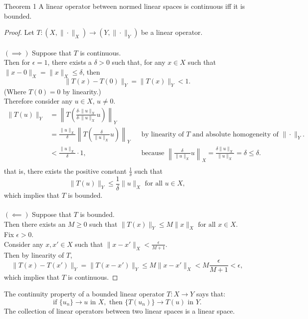 \begin{namedthm*}{Theorem 1}
    A linear operator between normed linear spaces is continuous iff it is bounded.    
\end{namedthm*}
\begin{proof}
    Let $T:(X,\|\cdot\|_X)\to(Y,\|\cdot\|_Y)$ be a linear operator.\\
    \\$(\implies)$ Suppose that $T$ is continuous.
    \\Then for $\epsilon=1$, there exists a $\delta>0$ such that, for any $x\in X$ such that $\|x-0\|_X=\|x\|_X\le\delta$, then
    \[
        \|T(x)-T(0)\|_Y=\|T(x)\|_Y<1.
    \]
    (Where $T(0)=0$ by linearity.)
    \\Therefore consider any $u\in X$, $u\neq0$.
    \begin{align*}
        \|T(u)\|_Y&=\left\|T\left(\frac{\delta\cdot\|u\|_X}{\delta\cdot\|u\|_X}u\right)\right\|_Y\\
        &=\frac{\|u\|_X}{\delta}\left\|T\left(\frac{\delta}{\|u\|_X}u\right)\right\|_Y&&\text{by linearity of $T$ and absolute homogeneity of $\|\cdot\|_Y$.}\\
        &<\frac{\|u\|_X}{\delta}\cdot1,&&\text{because }\left\|\frac{\delta}{\|u\|_X}u\right\|_X=\frac{\delta\|u\|_X}{\|u\|_X}=\delta\le\delta.\\
    \end{align*}
    that is, there exists the positive constant $\frac{1}{\delta}$ such that 
    \[
        \|T(u)\|_Y\le\frac{1}{\delta}\|u\|_X\text{ for all }u\in X,
    \]
    which implies that $T$ is bounded.\\
    \\$(\impliedby)$ Suppose that $T$ is bounded.
    \\Then there exists an $M\ge0$ such that 
    $
        \|T(x)\|_Y\le M\|x\|_X\text{ for all }x\in X.
    $
    \\Fix $\epsilon>0$.
    \\Consider any $x,x'\in X$ such that $\|x-x'\|_X<\frac{\epsilon}{M+1}$.
    \\Then by linearity of $T$,
    \[
        \|T(x)-T(x')\|_Y=\|T(x-x')\|_Y\le M\|x-x'\|_X<M\frac{\epsilon}{M+1}<\epsilon,
    \]
    which implies that $T$ is continuous.
\end{proof}
The continuity property of a bounded linear operator $T:X\to Y$ says that:
\[
    \text{if }\{u_n\}\to u\text{ in }X,\text{ then }\{T(u_n)\}\to T(u)\text{ in }Y.
\]
The collection of linear operators between two linear spaces is a linear space. 
